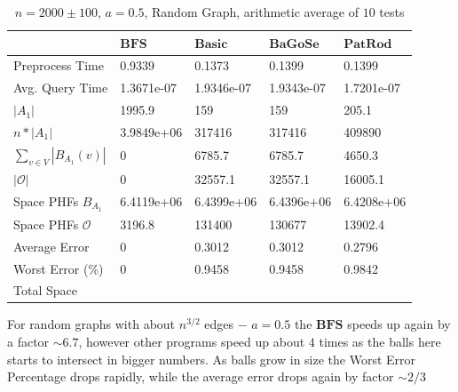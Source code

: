 \documentclass[shortabstract, lic, english]{iithesis}
\theoremstyle{definition} \newtheorem{definition}{Definition}[chapter]
\theoremstyle{remark} \newtheorem{remark}[definition]{Observation}
\theoremstyle{plain} \newtheorem{theorem}[definition]{Theorem}
\theoremstyle{plain} \newtheorem{lemma}[definition]{Lemma}
\theoremstyle{plain} \newtheorem{conjecture}[definition]{Conjecture}
\begin{document}
\begin{table}[H] \label{test:random.a0.5}
    \centering
    \begin{tabular}{ |p{3cm}||p{2cm}|p{2cm}|p{2cm}|p{2cm}|  } 
        \hline
        & $\mathbf{BFS}$ & $\mathbf{Basic}$ & $\mathbf{BaGoSe}$ & $\mathbf{PatRod}$ \\
        \hline
        \hline
        Preprocess Time                 & 0.9339     & 0.1373     & 0.1399      & 0.1399     \\
        \hline
        Avg. Query Time                 & 1.3671e-07 & 1.9346e-07 & 1.9343e-07  & 1.7201e-07 \\
        \hline
        $|A_1|$                         & 1995.9     & 159        & 159         & 205.1      \\
        \hline
        $n * |A_1|$                     & 3.9849e+06 & 317416     & 317416      & 409890     \\
        \hline
        $\sum_{v \in V} |B_{A_1}(v)| $  & 0          & 6785.7     & 6785.7      & 4650.3     \\
        \hline
        $|\mathcal{O}|$                 & 0          & 32557.1    & 32557.1     & 16005.1    \\
        \hline
        Space PHFs $B_{A_1}$            & 6.4119e+06 & 6.4399e+06 & 6.4396e+06  & 6.4208e+06 \\
        \hline
        Space PHFs $\mathcal{O}$        & 3196.8     & 131400     & 130677      & 13902.4    \\
        \hline
        Average Error                   & 0          & 0.3012     & 0.3012      & 0.2796     \\
        \hline
        Worst Error (\%)                & 0          & 0.9458     & 0.9458      & 0.9842     \\
        \hline
        Total Space                     &            &            &             &            \\
        \hline

    \end{tabular}
    \caption{$n = 2000 \pm 100$, $a = 0.5$, Random Graph, arithmetic average of $10$ tests}
\end{table}

For random graphs with about $n^{3/2}$ edges $-$ $a = 0.5$ the $\mathbf{BFS}$ speeds up again by a factor $\sim 6.7$, however other programs
speed up about $4$ times as the balls here starts to intersect in bigger numbers.
As balls grow in size the Worst Error Percentage drops rapidly, while the average error drops again by factor $\sim 2/3$
\end{document}
